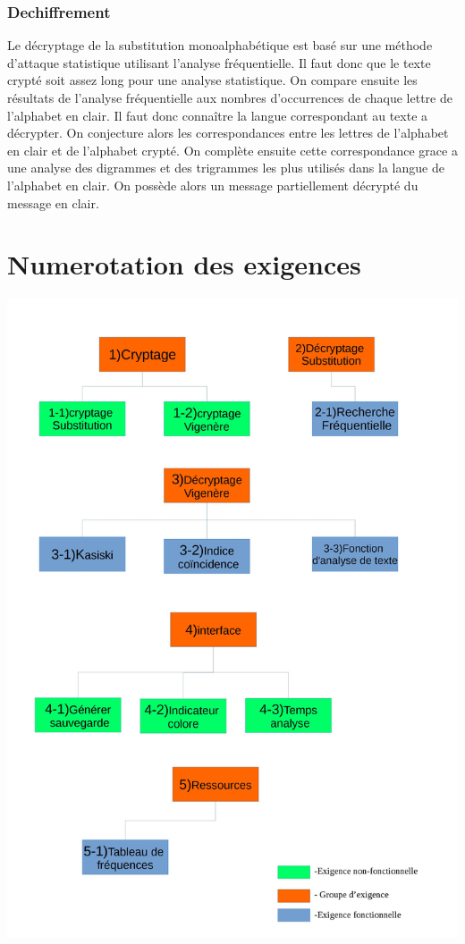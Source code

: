 \documentclass[a4]{article}
\begin{document}
			\subsubsection{Dechiffrement}
				Le  décryptage de la substitution monoalphabétique est basé sur une  méthode d’attaque
				 statistique utilisant l’analyse fréquentielle.
				Il faut donc que le texte crypté soit assez long pour une analyse statistique.
				On compare ensuite les résultats de l’analyse fréquentielle aux nombres d’occurrences
				de chaque lettre de l’alphabet en clair. Il faut donc connaître la langue correspondant 
				au texte a décrypter. 
				On conjecture alors les correspondances entre les lettres de l’alphabet en clair et de 
				l’alphabet crypté.
				On complète ensuite cette correspondance grace a une analyse des digrammes et des
				trigrammes les plus utilisés dans la langue de
				l’alphabet en clair.
				On possède alors un message partiellement décrypté du message en clair.
				
	\section{Numerotation des exigences}
		\includegraphics[scale=0.25]{Arbr.jpg} 
		
\end{document}
